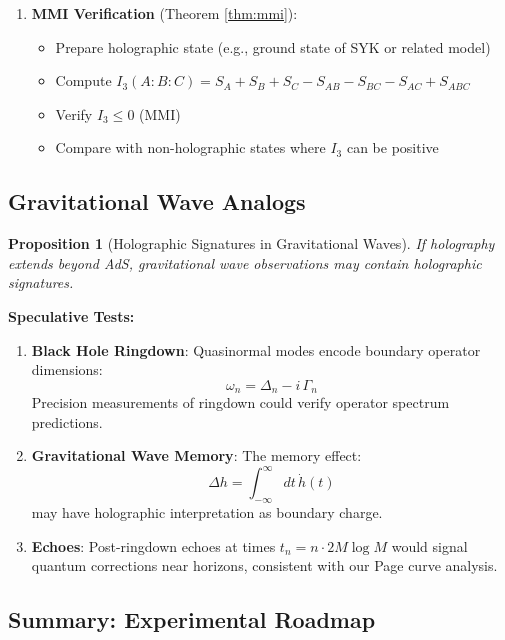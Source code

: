 \documentclass[12pt,a4paper]{article}
\newtheorem{proposition}[theorem]{Proposition}
\begin{document}
\begin{enumerate}
    \item \textbf{MMI Verification} (Theorem \ref{thm:mmi}):
    \begin{itemize}
        \item Prepare holographic state (e.g., ground state of SYK or related model)
        \item Compute $I_3(A:B:C) = S_A + S_B + S_C - S_{AB} - S_{BC} - S_{AC} + S_{ABC}$
        \item Verify $I_3 \leq 0$ (MMI)
        \item Compare with non-holographic states where $I_3$ can be positive
    \end{itemize}
\end{enumerate}

\subsection{Gravitational Wave Analogs}

\begin{proposition}[Holographic Signatures in Gravitational Waves]
If holography extends beyond AdS, gravitational wave observations may contain holographic signatures.
\end{proposition}

\textbf{Speculative Tests:}
\begin{enumerate}
    \item \textbf{Black Hole Ringdown}: Quasinormal modes encode boundary operator dimensions:
    \begin{equation}
    \omega_n = \Delta_n - i \, \Gamma_n
    \end{equation}
    Precision measurements of ringdown could verify operator spectrum predictions.
    
    \item \textbf{Gravitational Wave Memory}: The memory effect:
    \begin{equation}
    \Delta h = \int_{-\infty}^{\infty} dt \, \dot{h}(t)
    \end{equation}
    may have holographic interpretation as boundary charge.
    
    \item \textbf{Echoes}: Post-ringdown echoes at times $t_n = n \cdot 2M \log M$ would signal quantum corrections near horizons, consistent with our Page curve analysis.
\end{enumerate}

\subsection{Summary: Experimental Roadmap}
\end{document}
